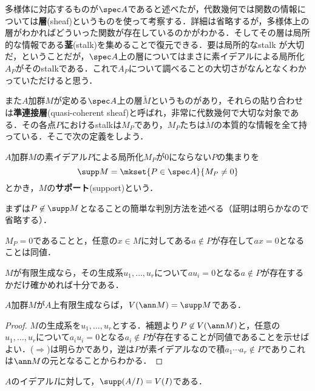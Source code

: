 \begin{tightcurve}
	多様体に対応するものが$\spec A$であると述べたが，代数幾何では関数の情報については\textbf{層}(sheaf)というものを使って考察する．詳細は省略するが，多様体上の層がわかればどういった関数が存在しているのかがわかる．そしてその層は局所的な情報である\textbf{茎}(stalk)を集めることで復元できる．要は局所的なstalk が大切だ，ということだが，$\spec A$上の層についてはまさに素イデアルによる局所化$A_P$がそのstalkである．これで$A_P$について調べることの大切さがなんとなくわかっていただけると思う．
	
	また$A$加群$M$が定める$\spec A$上の層$\widetilde{M}$というものがあり，それらの貼り合わせは\textbf{準連接層}(quasi-coherent sheaf)と呼ばれ，非常に代数幾何で大切な対象である．その各点$P$におけるstalkは$M_P$であり，$M_P$たちは$\widetilde{M}$の本質的な情報を全て持っている．そこで次の定義をしよう．
\end{tightcurve}

\begin{defi}[サポート]\label{defi:support}
	$A$加群$M$の素イデアル$ P$による局所化$M_P$が0にならない$ P$の集まりを
	\[\supp M=\mkset{ P\in\spec A}{M_ P\neq 0}\]
	とかき，$M$の\textbf{サポート}(support)という．
\end{defi}

まずは$P\not\in\supp M$となることの簡単な判別方法を述べる（証明は明らかなので省略する）．

\begin{lem}\label{lem:M_p=0との同値条件}
	$M_P=0$であることと，任意の$x\in M$に対してある$a\not\in P$が存在して$ax=0$となることは同値．
\end{lem}

$M$が有限生成なら，その生成系$u_1,\dots,u_r$について$au_i=0$となる$a\not\in P$が存在するかだけ確かめれば十分である．

\begin{prop}\label{prop:Zariskiの閉集合とsupp}
	$A$加群$M$が$A$上有限生成ならば，$V(\ann M)=\supp M$である．
\end{prop}

\begin{proof}
	$M$の生成系を$u_1,\dots,u_r$とする．補題より$P\not\in V(\ann M)$と，任意の$u_1,\dots,u_r$について$a_iu_i=0$となる$a_i\not\in P$が存在することが同値であることを示せばよい．($\Longrightarrow$)は明らかであり，逆は$P$が素イデアルなので積$a_1\cdots a_r\not\in P$でありこれは$\ann M$の元となることからわかる．
\end{proof}
\begin{cor}\label{cor:supp A/I}
	$A$のイデアル$I$に対して，$\supp (A/I)=V(I)$である．
\end{cor}

